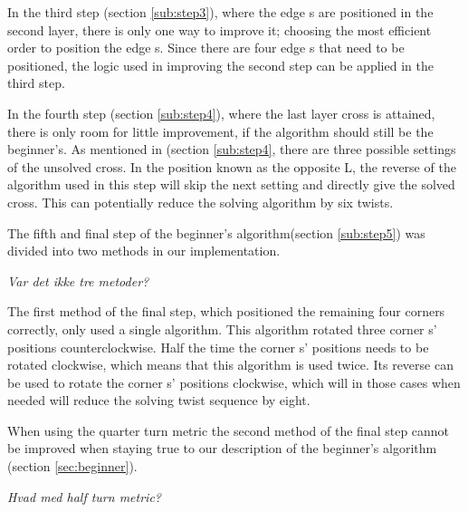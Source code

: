 In the third step (section \ref{sub:step3}), where the edge \cpiece{}s are positioned in the second layer, there is only one way to improve it; choosing the most efficient order to position the edge \cpiece{}s. Since there are four edge \cpiece{}s that need to be positioned, the logic used in improving the second step can be applied in the third step.

In the fourth step (section \ref{sub:step4}), where the last layer cross is attained, there is only room for little improvement, if the algorithm should still be the beginner's. As mentioned in (section \ref{sub:step4}, there are three possible settings of the unsolved cross. In the position known as the opposite L, the reverse of the algorithm used in this step will skip the next setting and directly give the solved cross. This can potentially reduce the solving algorithm by six twists.


The fifth and final step of the beginner's algorithm(section \ref{sub:step5}) was divided into two methods in our implementation.

\emph{Var det ikke tre metoder?}

The first method of the final step, which positioned the remaining four corners correctly, only used a single algorithm. This algorithm rotated three corner \cpiece{}s' positions counterclockwise. Half the time the corner \cpiece{}s' positions needs to be rotated clockwise, which means that this algorithm is used twice. Its reverse can be used to rotate the corner \cpiece{}s' positions clockwise, which will in those cases when needed will reduce the solving twist sequence by eight.

When using the quarter turn metric the second method of the final step cannot be improved when staying true to our description of the beginner's algorithm (section \ref{sec:beginner}).

\emph{Hvad med half turn metric?}